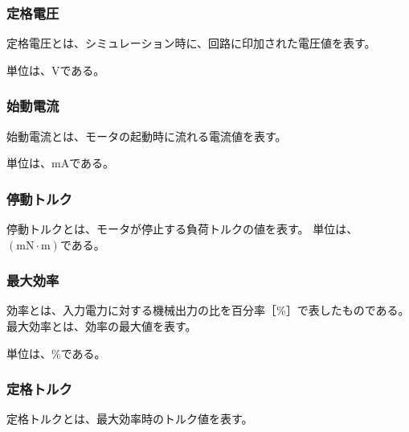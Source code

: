 \subsubsection{定格電圧}\label{sub:sub:dennatu}
定格電圧とは、シミュレーション時に、回路に印加された電圧値を表す。

単位は、$\mathrm{V}$である。
\subsubsection{始動電流}\label{sub:sub:sidouden}
始動電流とは、モータの起動時に流れる電流値を表す。

単位は、$\mathrm{mA}$である。
\subsubsection{停動トルク}\label{sub:sub:teidoutoruku}
停動トルクとは、モータが停止する負荷トルクの値を表す。
単位は、$(\mathrm{mN \cdot m})$である。
\subsubsection{最大効率}\label{sub:sub:saidaikouritu}
効率とは、入力電力に対する機械出力の比を百分率［\%］で表したものである。最大効率とは、効率の最大値を表す。

単位は、$\mathrm{\%}$である。
\subsubsection{定格トルク}\label{sub:sub:teikakutoruku}
定格トルクとは、最大効率時のトルク値を表す。

